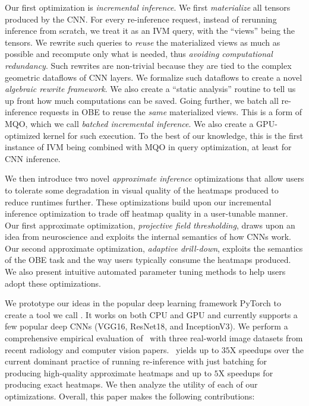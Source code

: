 Our first optimization is \textit{incremental inference}. We first \textit{materialize} all tensors produced by the CNN. For every re-inference request, instead of rerunning inference from scratch, we treat it as an IVM query, with the ``views'' being the tensors. We rewrite such queries to \textit{reuse} the materialized views as much as possible and recompute only what is needed, thus \textit{avoiding computational redundancy}. Such rewrites are non-trivial because they are tied to the complex geometric dataflows of CNN layers. We formalize such dataflows to create a novel \textit{algebraic rewrite framework}. We also create a ``static analysis'' routine to tell us up front how much computations can be saved. Going further, we batch all re-inference requests in OBE to reuse the \textit{same} materialized views. This is a form of MQO, which we call \textit{batched incremental inference}. We also create a GPU-optimized kernel for such execution. To the best of our knowledge, this is the first instance of IVM being combined with MQO in query optimization, at least for CNN inference.

We then introduce two novel \textit{approximate inference} optimizations that allow users to tolerate some degradation in visual quality of the heatmaps produced to reduce runtimes further. These optimizations build upon our incremental inference optimization to trade off heatmap quality in a user-tunable manner. Our first approximate optimization, \textit{projective field thresholding}, draws upon an idea from neuroscience and exploits the internal semantics of how CNNs work. Our second approximate optimization, \textit{adaptive drill-down}, exploits the semantics of the OBE task and the way users typically consume the heatmaps produced. We also present intuitive automated parameter tuning methods to help users adopt these optimizations.

We prototype our ideas in the popular deep learning framework PyTorch to create a tool we call \system. It works on both CPU and GPU and currently supports a few popular deep CNNs (VGG16, ResNet18, and InceptionV3). We perform a comprehensive empirical evaluation of \system ~with three real-world image datasets from recent radiology and computer vision papers. \system ~yields up to $35$X speedups over the current dominant practice of running re-inference with just batching for producing high-quality approximate heatmaps and up to $5$X speedups for producing exact heatmaps. We then analyze the utility of each of our optimizations. Overall, this paper makes the following contributions:


